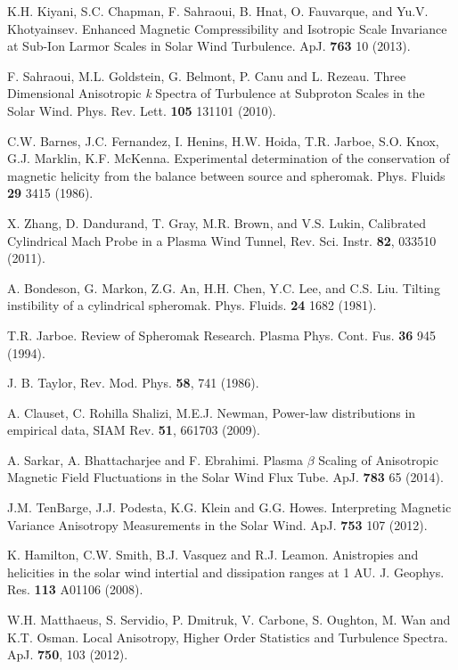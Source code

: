 \documentclass[aip,prl,amsmath,amssymb,reprint,superscriptaddress]{revtex4-1} %
\begin{document}
\begin{thebibliography}{99}
 K.H. Kiyani, S.C. Chapman, F. Sahraoui, B. Hnat, O. Fauvarque, and Yu.V. Khotyainsev. Enhanced Magnetic Compressibility and Isotropic Scale Invariance at Sub-Ion Larmor Scales in Solar Wind Turbulence. ApJ. {\bf 763} 10 (2013).

 F. Sahraoui, M.L. Goldstein, G. Belmont, P. Canu and L. Rezeau. Three Dimensional Anisotropic {\it k} Spectra of Turbulence at Subproton Scales in the Solar Wind. Phys. Rev. Lett. {\bf 105} 131101 (2010).

C.W. Barnes, J.C. Fernandez, I. Henins, H.W. Hoida, T.R. Jarboe, S.O. Knox, G.J. Marklin, K.F. McKenna. Experimental determination of the conservation of magnetic helicity from the balance between source and spheromak. Phys. Fluids {\bf 29} 3415 (1986).

 X. Zhang, D. Dandurand, T. Gray, M.R. Brown, and V.S. Lukin, Calibrated Cylindrical Mach Probe in a Plasma Wind Tunnel, Rev. Sci. Instr. {\bf 82}, 033510 (2011).

 A. Bondeson, G. Markon, Z.G. An, H.H. Chen, Y.C. Lee, and C.S. Liu. Tilting instibility of a cylindrical spheromak. Phys. Fluids. {\bf 24} 1682 (1981).

T.R. Jarboe. Review of Spheromak Research. Plasma Phys. Cont. Fus. {\bf 36} 945 (1994).

 J. B. Taylor, Rev. Mod. Phys. {\bf 58}, 741 (1986).

A. Clauset, C. Rohilla Shalizi, M.E.J. Newman, Power-law distributions in empirical data, SIAM Rev. {\bf 51}, 661703 (2009).

A. Sarkar, A. Bhattacharjee and F. Ebrahimi. Plasma $\beta$ Scaling of Anisotropic Magnetic Field Fluctuations in the Solar Wind Flux Tube. ApJ. {\bf 783} 65 (2014).

 J.M. TenBarge, J.J. Podesta, K.G. Klein and G.G. Howes. Interpreting Magnetic Variance Anisotropy Measurements in the Solar Wind. ApJ. {\bf 753} 107 (2012).

 K. Hamilton, C.W. Smith, B.J. Vasquez and R.J. Leamon. Anistropies and helicities in the solar wind intertial and dissipation ranges at 1 AU. J. Geophys. Res. {\bf 113} A01106 (2008).

W.H. Matthaeus, S. Servidio, P. Dmitruk, V. Carbone, S. Oughton, M. Wan and K.T. Osman. Local Anisotropy, Higher Order Statistics and Turbulence Spectra. ApJ. {\bf 750}, 103 (2012).


\end{thebibliography}
\end{document}
